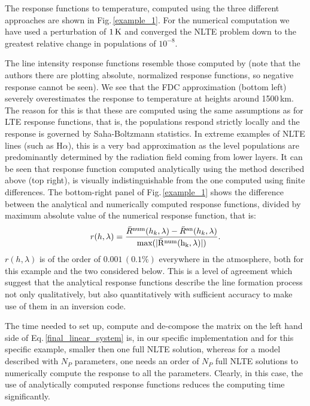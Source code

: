\documentclass[referee]{aa}
\begin{document}
The response functions to temperature, computed using the three different approaches are shown in Fig.\,\ref{example_1}. For the numerical computation we have used a perturbation of $1\,\rm{K}$ and converged the NLTE problem down to the greatest relative change in populations of $10^{-8}$. 

The line intensity response functions resemble those computed by \citet{Hector_halpha} (note that the authors there are plotting absolute, normalized response functions, so negative response cannot be seen). We see that the FDC approximation (bottom left) severely overestimates the response to temperature at heights around 1500\,km. The reason for this is that these are computed using the same assumptions as for LTE response functions, that is, the populations respond strictly locally and the response is governed by Saha-Boltzmann statistics. In extreme examples of NLTE lines (such as H$\alpha$), this is a very bad approximation as the level populations are predominantly determined by the radiation field coming from lower layers. It can be seen that response function computed analytically using the method described above (top right), is visually indistinguishable from the one computed using finite differences. The bottom-right panel of Fig.\,\ref{example_1} shows the difference between the analytical and numerically computed response functions, divided by maximum absolute value of the numerical response function, that is:
\begin{equation}
r(h,\lambda) = \frac{\bar{R}^{\rm num}(h_k,\lambda) - \bar{R}^{\rm an}(h_k,\lambda)}{\rm max (|\bar{R}^{\rm num}(h_k,\lambda)|)}.
\end{equation}
$r(h,\lambda)$ is of the order of $0.001\,(0.1\%)$ everywhere in the atmosphere, both for this example and the two considered below. This is a level of agreement which suggest that the analytical response functions describe the line formation process not only qualitatively, but also quantitatively with sufficient accuracy to make use of them in an inversion code. 

 The time needed to set up, compute and de-compose the matrix on the left hand side of Eq.\,\ref{final_linear_system} is, in our specific implementation and for this specific example, smaller then one full NLTE solution, whereas for a model described with $N_P$ parameters, one needs an order of $N_P$ full NLTE solutions to numerically compute the response to all the parameters. Clearly, in this case, the use of analytically computed response functions reduces the computing time significantly.
\end{document}
